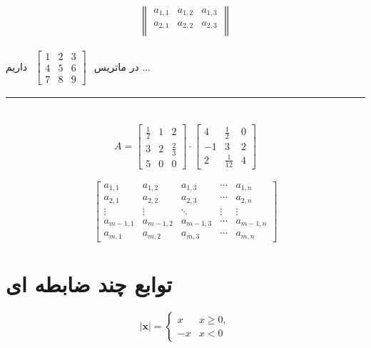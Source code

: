 \documentclass[12pt]{article}
\begin{document}
\begin{align*}
	\begin{Vmatrix}
		a_{1,1} & a_{1,2} & a_{1,3}\\
		a_{2,1} & a_{2,2} & a_{2,3}\\
	\end{Vmatrix}
\end{align*}

در ماتریس 
$
\begin{smallmatrix}
\begin{bmatrix}
1&2&3\\
4&5&6\\
7&8&9
\end{bmatrix}
\end{smallmatrix}
$
داریم ...\\

\rule{\textwidth}{1pt}\\

\begin{align*}
A = 
\begin{bmatrix}
	\frac{1}{2} & 1 & 2 \\
	3 & 2 & \frac{2}{3} \\
	5 & 0 & 0	
\end{bmatrix}
\cdot
\begin{bmatrix}
	4 & \frac{1}{2} & 0 \\
	-1 & 3 & 2\\
	2 & \frac{1}{12} & 4
\end{bmatrix}
\end{align*}

\[
\begin{bmatrix}
a_{1,1} & a_{1,2} & a_{1,3} & \cdots & a_{1,n} \\
a_{2,1} & a_{2,2} & a_{2,3} & \cdots & a_{2,n} \\
\vdots & \vdots & \ddots & \vdots & \vdots \\
a_{m-1,1} & a_{m-1,2} & a_{m-1,3} & \cdots & a_{m-1,n} \\
a_{m,1} & a_{m,2} & a_{m,3} & \cdots & a_{m,n} 
\end{bmatrix}
\]

\section{توابع چند ضابطه ای}


\begin{equation}
\mathbf{|x|} =
\begin{cases}
	x & x\ge 0,\\
	-x & x < 0	
\end{cases}
\end{equation}
\end{document}
